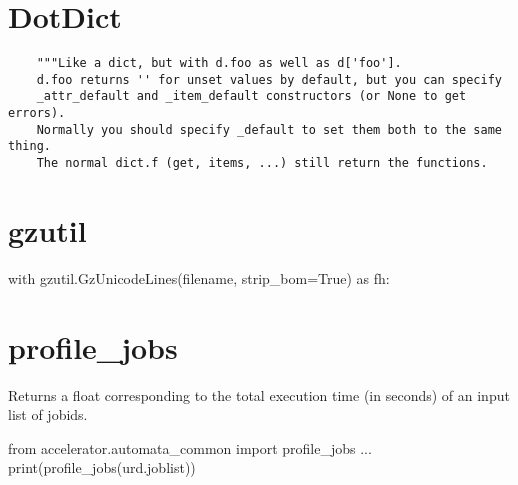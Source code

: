 \section{DotDict}
\begin{verbatim}
    """Like a dict, but with d.foo as well as d['foo'].
    d.foo returns '' for unset values by default, but you can specify
    _attr_default and _item_default constructors (or None to get errors).
    Normally you should specify _default to set them both to the same thing.
    The normal dict.f (get, items, ...) still return the functions.
\end{verbatim}



\section{gzutil}
\begin{python}
with gzutil.GzUnicodeLines(filename, strip_bom=True) as fh:
\end{python}



\section{profile\_jobs}
Returns a float corresponding to the total execution time (in seconds)
of an input list of jobids.
\begin{python}
from accelerator.automata_common import profile_jobs
...
print(profile_jobs(urd.joblist))
\end{python}
